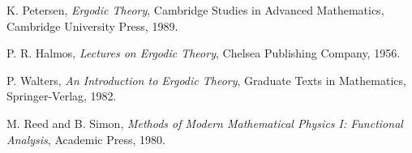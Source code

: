 \documentclass{article}
\newcommand{\tmem}[1]{{\em #1\/}}
\begin{document}
\begin{thebibliography}{9}
  {}K. Petersen, {\tmem{Ergodic Theory}},
  Cambridge Studies in Advanced Mathematics, Cambridge University Press, 1989.
  
  {}P. R. Halmos, {\tmem{Lectures on Ergodic
  Theory}}, Chelsea Publishing Company, 1956.
  
  {}P. Walters, {\tmem{An Introduction to
  Ergodic Theory}}, Graduate Texts in Mathematics, Springer-Verlag, 1982.
  
  {}M. Reed and B. Simon, {\tmem{Methods of Modern
  Mathematical Physics I: Functional Analysis}}, Academic Press, 1980.
\end{thebibliography}

\
\end{document}
